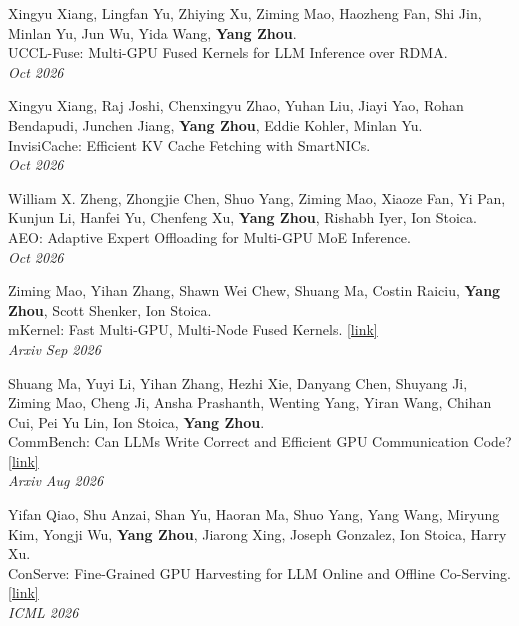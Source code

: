 \documentclass[letterpaper, 11pt]{article}
\newcounter{mySaveCounter}
\newenvironment{myEnumerateCitation}{%
  \begin{enumerate}[label={[\arabic*]},ref={[\arabic*]}]
    \usecounter{enumi}%
    \setcounter{enumi}{\value{mySaveCounter}}
    \setlength{\itemsep}{0pt}%
    \setlength{\parskip}{5pt}%
}
{%
  \setcounter{mySaveCounter}{\value{enumi}}\end{enumerate}%
}
\begin{document}
\begin{myEnumerateCitation}

\item Xingyu Xiang, Lingfan Yu, Zhiying Xu, Ziming Mao, Haozheng Fan, Shi Jin, Minlan Yu, Jun Wu, Yida Wang, \textbf{Yang Zhou}.
\\UCCL-Fuse: Multi-GPU Fused Kernels for LLM Inference over RDMA.
\\\textit{Oct 2026}

\item Xingyu Xiang, Raj Joshi, Chenxingyu Zhao, Yuhan Liu, Jiayi Yao, Rohan Bendapudi, Junchen Jiang, \textbf{Yang Zhou}, Eddie Kohler, Minlan Yu.
\\InvisiCache: Efficient KV Cache Fetching with SmartNICs.
\\\textit{Oct 2026}

\item William X. Zheng, Zhongjie Chen, Shuo Yang, Ziming Mao, Xiaoze Fan, Yi Pan, Kunjun Li, Hanfei Yu, Chenfeng Xu, \textbf{Yang Zhou}, Rishabh Iyer, Ion Stoica.
\\AEO: Adaptive Expert Offloading for Multi-GPU MoE Inference.
\\\textit{Oct 2026}

\item Ziming Mao, Yihan Zhang, Shawn Wei Chew, Shuang Ma, Costin Raiciu, \textbf{Yang Zhou}, Scott Shenker, Ion Stoica.
\\mKernel: Fast Multi-GPU, Multi-Node Fused Kernels. \href{https://arxiv.org/pdf/2609.13585}{[link]}
\\\textit{Arxiv Sep 2026}

\item Shuang Ma, Yuyi Li, Yihan Zhang, Hezhi Xie, Danyang Chen, Shuyang Ji, Ziming Mao, Cheng Ji, Ansha Prashanth, Wenting Yang, Yiran Wang, Chihan Cui, Pei Yu Lin, Ion Stoica, \textbf{Yang Zhou}.
\\CommBench: Can LLMs Write Correct and Efficient GPU Communication Code? \href{https://arxiv.org/pdf/2608.04450}{[link]}
\\\textit{Arxiv Aug 2026}

\item Yifan Qiao, Shu Anzai, Shan Yu, Haoran Ma, Shuo Yang, Yang Wang, Miryung Kim, Yongji Wu, \textbf{Yang Zhou}, Jiarong Xing, Joseph Gonzalez, Ion Stoica, Harry Xu.
\\ConServe: Fine-Grained GPU Harvesting for LLM Online and Offline Co-Serving. \href{https://openreview.net/pdf?id=eKfWG67mZB}{[link]}
\\\textit{ICML 2026}


\end{myEnumerateCitation}
\end{document}
